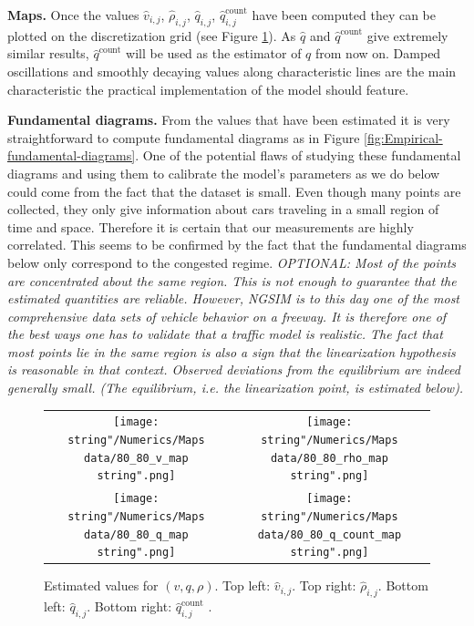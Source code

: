\documentclass[preprint]{elsarticle}
\begin{document}
\textbf{Maps.} Once the values $\widehat{v}_{i,j}$, $\widehat{\rho}_{i,j}$, $\widehat{q}_{i,j}$,
$\widehat{q}_{i,j}^{\text{count}}$ have been computed they can be plotted
on the discretization grid (see Figure \ref{fig:Estimated-values}).
As $\widehat{q}$ and $\widehat{q}^{\text{count}}$ give extremely similar
results, $\widehat{q}^{\text{count}}$ will be used as the estimator of $q$
from now on.
Damped oscillations
and smoothly decaying values along characteristic lines are the main characteristic the practical implementation of the model should feature.

\textbf{Fundamental diagrams.} From the values that have been estimated it is very straightforward
to compute fundamental diagrams as in Figure \ref{fig:Empirical-fundamental-diagrams}.
One of the potential flaws of studying these fundamental diagrams
and using them to calibrate the model's parameters as we do below
could come from the fact that the dataset is small. Even though many
points are collected, they only give information about cars traveling
in a small region of time and space. Therefore it is certain that
our measurements are highly correlated. This seems
to be confirmed by the fact that the fundamental diagrams below only
correspond to the congested regime. \textit{OPTIONAL: Most of the points are concentrated
about the same region. This is not enough to guarantee that the estimated
quantities are reliable. However, NGSIM is to this day one of the
most comprehensive data sets of vehicle behavior on a freeway. It
is therefore one of the best ways one has to validate that a traffic
model is realistic. The fact that most points lie in the same region
is also a sign that the linearization hypothesis is reasonable
in that context. Observed deviations from the equilibrium are indeed
generally small. (The equilibrium, i.e. the linearization point, is estimated
below).}

\begin{figure}[H]
\centering
\begin{tabular}{cc}
\texttt{[image: \\string"/Numerics/Maps data/80\_80\_v\_map\\string".png]} & \texttt{[image: \\string"/Numerics/Maps data/80\_80\_rho\_map\\string".png]}\tabularnewline
\texttt{[image: \\string"/Numerics/Maps data/80\_80\_q\_map\\string".png]} & \texttt{[image: \\string"/Numerics/Maps data/80\_80\_q\_count\_map\\string".png]}\tabularnewline
\end{tabular}
\protect\caption{Estimated values for $\left(v,q,\rho\right)$. Top left: $\widehat{v}_{i,j}$.
Top right: $\widehat{\rho}_{i,j}$. Bottom left: $\widehat{q}_{i,j}$.
Bottom right: $\widehat{q}_{i,j}^{\text{count}}$ .\label{fig:Estimated-values}}
\end{figure}
\end{document}
